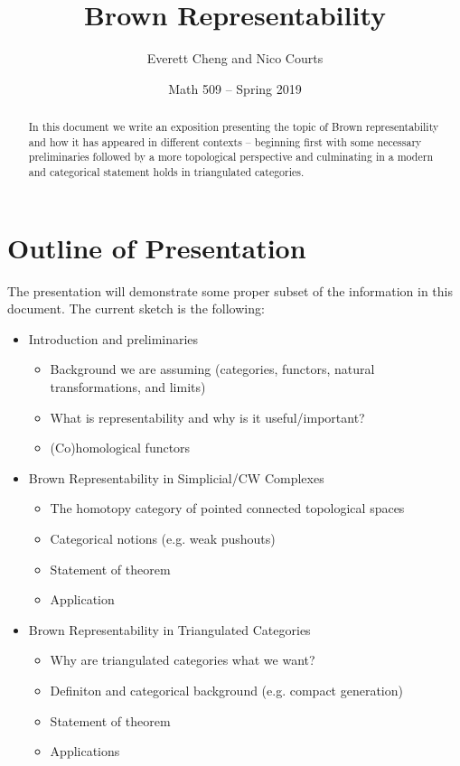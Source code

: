 \documentclass[12pt]{article}
\begin{document}
\title{Brown Representability\vspace{-1ex}}
\author{Everett Cheng and Nico Courts}
\date{Math 509 -- Spring 2019}
\maketitle

\renewcommand{\abstractname}{Introduction}
\begin{abstract}
  In this document we write an exposition presenting the topic of Brown representability and how it has appeared in different contexts -- beginning first with some necessary preliminaries followed by a more topological perspective and culminating in a modern and categorical statement holds in triangulated categories.
\end{abstract}
\tableofcontents

\newpage
\section{Outline of Presentation}
The presentation will demonstrate some proper subset of the information in this document. The current sketch is the following:
\begin{itemize}
	\item Introduction and preliminaries
	\begin{itemize}
		\item Background we are assuming (categories, functors, natural transformations, and limits)
		\item What is representability and why is it useful/important?
		\item (Co)homological functors
	\end{itemize}
	\item Brown Representability in Simplicial/CW Complexes
	\begin{itemize}
		\item The homotopy category of pointed connected topological spaces
		\item Categorical notions (e.g. weak pushouts)
		\item Statement of theorem
		\item Application
	\end{itemize}
	\item Brown Representability in Triangulated Categories
	\begin{itemize}
		\item Why are triangulated categories what we want?
		\item Definiton and categorical background (e.g. compact generation)
		\item Statement of theorem
		\item Applications
	\end{itemize}
\end{itemize}
\end{document}
